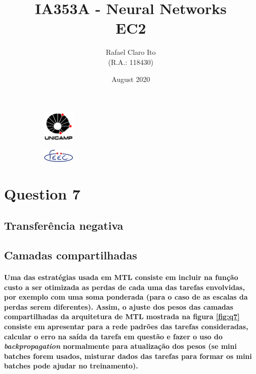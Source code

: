 \documentclass[a4paper]{article}    %
\begin{document}
\begin{figure}
    \centering
    \begin{subfigure}{0.45\textwidth}
        \centering
        \includegraphics[width=1.5cm]{unicamp}
    \end{subfigure}
    \hfill
    \begin{subfigure}{0.45\textwidth}
        \centering
        \includegraphics[width=1.5cm]{feec}
    \end{subfigure}
\end{figure}

\title{
    \vspace{5cm}
    IA353A - Neural Networks\\
    EC2
    \vspace{1cm}
}
\author{
    Rafael Claro Ito\\
    (R.A.: 118430)
    \vspace{11cm}
}
\date{August 2020}
\maketitle
\newpage

\setcounter{section}{7}
\section*{Question 7}

\subsection{Transferência negativa}

\subsection{Camadas compartilhadas}
\paragraph{Uma das estratégias usada em MTL consiste em incluir na função custo a ser otimizada as perdas de cada uma das tarefas envolvidas, por exemplo com uma soma ponderada (para o caso de as escalas da perdas serem diferentes). Assim, o ajuste dos pesos das camadas compartilhadas da arquitetura de MTL mostrada na figura \ref{fig:q7} consiste em apresentar para a rede padrões das tarefas consideradas, calcular o erro na saída da tarefa em questão e fazer o uso do \emph{backpropagation} normalmente para atualização dos pesos (se mini batches forem usados, misturar dados das tarefas para formar os mini batches pode ajudar no treinamento).}
\end{document}
